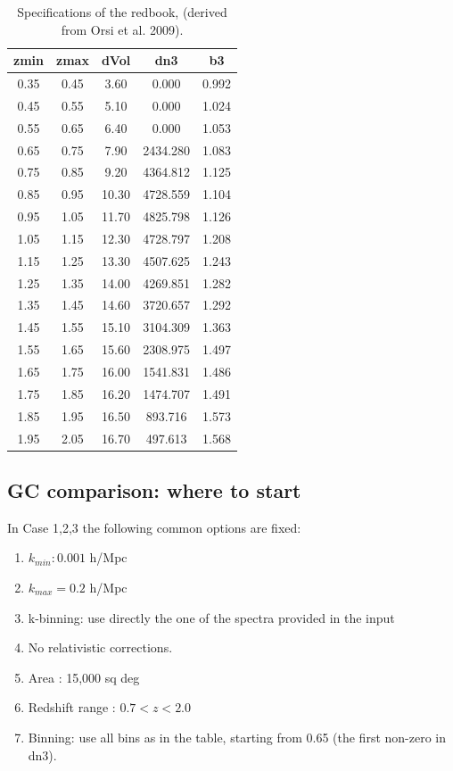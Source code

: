 \begin{table}[htdp]
\caption{Specifications of the redbook, (derived from Orsi et al. 2009).}
\begin{center}
\begin{tabular}{c|c|c|c|c}
\hline
 {\bf zmin} & {\bf zmax} & {\bf dVol} & {\bf dn3} & {\bf b3} \\
\hline 
\hline
0.35 & 0.45 & 3.60 & 0.000 & 0.992 \\
0.45 & 0.55 & 5.10 & 0.000 & 1.024 \\
0.55 & 0.65 & 6.40 & 0.000 & 1.053 \\
0.65 & 0.75 & 7.90 & 2434.280 & 1.083 \\
0.75 & 0.85 & 9.20 & 4364.812 & 1.125 \\
0.85 & 0.95 & 10.30 & 4728.559 & 1.104 \\
 0.95 & 1.05 & 11.70 & 4825.798 & 1.126 \\
1.05 & 1.15 & 12.30 & 4728.797 & 1.208 \\
1.15 & 1.25 & 13.30 & 4507.625 & 1.243 \\
1.25 & 1.35 & 14.00 & 4269.851 & 1.282 \\
1.35 & 1.45 & 14.60 & 3720.657 & 1.292 \\
1.45 & 1.55 & 15.10 & 3104.309 & 1.363 \\
1.55 & 1.65 & 15.60 & 2308.975 & 1.497 \\
1.65 & 1.75 & 16.00 & 1541.831 & 1.486 \\
1.75 & 1.85 & 16.20 & 1474.707 & 1.491 \\
1.85 & 1.95 & 16.50 & 893.716 & 1.573 \\
1.95 & 2.05 & 16.70 & 497.613 & 1.568\\ 
\hline
\hline
\end{tabular}
\end{center}
\label{tableGC}
\end{table}%

\subsection*{GC comparison: where to start}
In Case 1,2,3 the following common options are fixed:
\begin{enumerate}
\item $k_{min}: 0.001$ h/Mpc
\item $k_{max} = 0.2$ h/Mpc
\item k-binning: use directly the one of the spectra provided in the input
\item No relativistic corrections.
\item Area : 15,000 sq deg
\item Redshift range : $0.7 < z < 2.0$
\item Binning: use all bins as in the table, starting from 0.65 (the first non-zero in dn3).
\end{enumerate}

